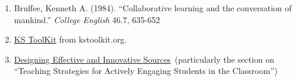\begin{enumerate}
\def\labelenumi{\arabic{enumi}.}
\item
  Bruffee, Kenneth A. (1984). ``Collaborative learning and the
  conversation of mankind.'' \emph{College English} 46.7, 635-652
\item
  \href{http://www.kstoolkit.org/KS+Methods}{KS ToolKit} from
  kstoolkit.org.
\item
  \href{http://serc.carleton.edu/NAGTWorkshops/coursedesign/tutorial/strategies.html}{Designing
  Effective and Innovative Sources}~(particularly the section on
  ``Teaching Strategies for Actively Engaging Students in the
  Classroom'')
\end{enumerate}
